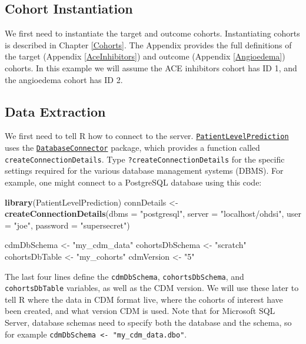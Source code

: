 \documentclass[11pt]{book}
\newenvironment{Shaded}{\begin{snugshade}}{\end{snugshade}}
\newcommand{\KeywordTok}[1]{\textcolor[rgb]{0.13,0.29,0.53}{\textbf{#1}}}
\newcommand{\DataTypeTok}[1]{\textcolor[rgb]{0.13,0.29,0.53}{#1}}
\newcommand{\StringTok}[1]{\textcolor[rgb]{0.31,0.60,0.02}{#1}}
\newcommand{\NormalTok}[1]{#1}
\theoremstyle{definition}
\theoremstyle{definition}
\theoremstyle{definition}
\theoremstyle{remark}
\begin{document}
\subsection{Cohort Instantiation}\label{cohort-instantiation-1}

We first need to instantiate the target and outcome cohorts.
Instantiating cohorts is described in Chapter \ref{Cohorts}. The
Appendix provides the full definitions of the target (Appendix
\ref{AceInhibitors}) and outcome (Appendix \ref{Angioedema}) cohorts. In
this example we will assume the ACE inhibitors cohort has ID 1, and the
angioedema cohort has ID 2.

\subsection{Data Extraction}\label{data-extraction-1}

We first need to tell R how to connect to the server.
\href{https://ohdsi.github.io/PatientLevelPrediction/}{\texttt{PatientLevelPrediction}}
uses the
\href{https://ohdsi.github.io/DatabaseConnector/}{\texttt{DatabaseConnector}}
package, which provides a function called
\texttt{createConnectionDetails}. Type \texttt{?createConnectionDetails}
for the specific settings required for the various database management
systems (DBMS). For example, one might connect to a PostgreSQL database
using this code:

\begin{Shaded}
\begin{Highlighting}[]
\KeywordTok{library}\NormalTok{(PatientLevelPrediction)}
\NormalTok{connDetails <-}\StringTok{ }\KeywordTok{createConnectionDetails}\NormalTok{(}\DataTypeTok{dbms =} \StringTok{"postgresql"}\NormalTok{,}
                                       \DataTypeTok{server =} \StringTok{"localhost/ohdsi"}\NormalTok{,}
                                       \DataTypeTok{user =} \StringTok{"joe"}\NormalTok{,}
                                       \DataTypeTok{password =} \StringTok{"supersecret"}\NormalTok{)}

\NormalTok{cdmDbSchema <-}\StringTok{ "my_cdm_data"}
\NormalTok{cohortsDbSchema <-}\StringTok{ "scratch"}
\NormalTok{cohortsDbTable <-}\StringTok{ "my_cohorts"}
\NormalTok{cdmVersion <-}\StringTok{ "5"}
\end{Highlighting}
\end{Shaded}

The last four lines define the \texttt{cdmDbSchema},
\texttt{cohortsDbSchema}, and \texttt{cohortsDbTable} variables, as well
as the CDM version. We will use these later to tell R where the data in
CDM format live, where the cohorts of interest have been created, and
what version CDM is used. Note that for Microsoft SQL Server, database
schemas need to specify both the database and the schema, so for example
\texttt{cdmDbSchema\ \textless{}-\ "my\_cdm\_data.dbo"}.
\end{document}
